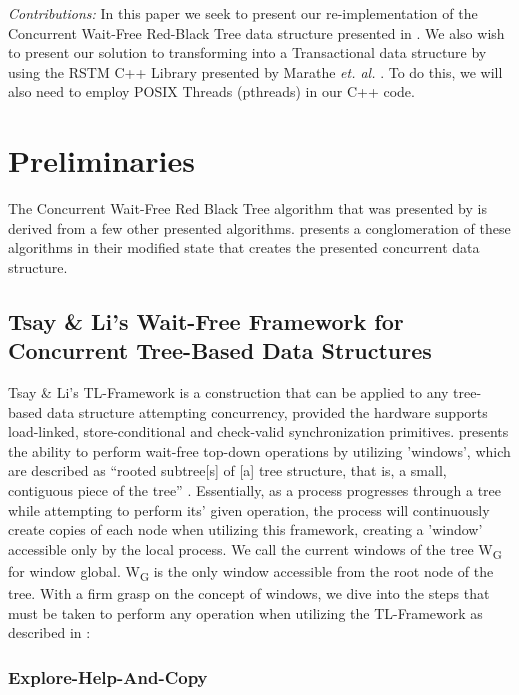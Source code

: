 \documentclass[letterpaper, 10 pt, conference]{ieeeconf}
\begin{document}
	\textit{Contributions: }In this paper we seek to present our re-implementation of the Concurrent Wait-Free Red-Black Tree data structure presented in \cite{c1}. We also wish to present our solution to transforming \cite{c1} into a Transactional data structure by using the RSTM C++ Library presented by Marathe \textit{et. al.} \cite{c6}. To do this, we will also need to employ POSIX Threads (pthreads) in our C++ code.
	\section{Preliminaries}
	
	 The Concurrent Wait-Free Red Black Tree algorithm that was presented by \cite{c1} is derived from a few other presented algorithms. \cite{c1} presents a conglomeration of these algorithms in their modified state that creates the presented concurrent data structure.
	 
	 \subsection*{Tsay \& Li's Wait-Free Framework for Concurrent Tree-Based Data Structures}
	 Tsay \& Li's \cite{c5} TL-Framework is a construction that can be applied to any tree-based data structure attempting concurrency, provided the hardware supports load-linked, store-conditional and check-valid synchronization primitives. \cite{c5} presents the ability to perform wait-free top-down operations by utilizing 'windows', which are described as ``rooted subtree[s] of [a] tree structure, that is, a small, contiguous piece of the tree'' \cite{c1}. Essentially, as a process progresses through a tree while attempting to perform its' given operation, the process will continuously create copies of each node when utilizing this framework, creating a 'window' accessible only by the local process. We call the current windows of the tree W\textsubscript{G} for window global. W\textsubscript{G} is the only window accessible from the root node of the tree. With a firm grasp on the concept of windows, we dive into the steps that must be taken to perform any operation when utilizing the TL-Framework as described in \cite{c1}:
	 \subsubsection{Explore-Help-And-Copy}
\end{document}
